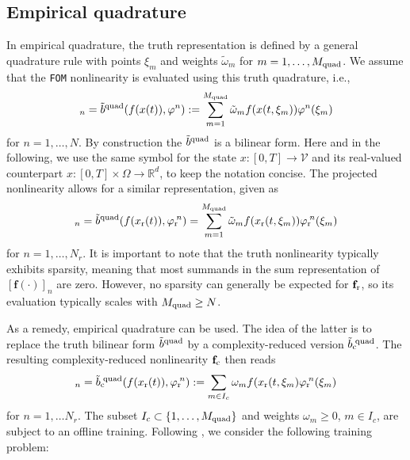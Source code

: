 \documentclass[onefignum,onetabnum]{siamart251104}
\newcommand{\bv}[1]{{\mathbf #1}}
\newcommand{\com}[1]{{{#1}_{\rm{c}}}} %
\newcommand{\rom}[1]{{{#1}_{\rm{r}}}}
\newcommand{\Nr}{{N_r}}
\newcommand{\R}{\mathbb{R}}
\newcommand{\ffun}{{\bv{f}}}
\newcommand{\bform}{{b}}
\newcommand{\tL}{{\fs{\varphi}}}
\newcommand{\fs}[1]{{{#1}}} %
\newcommand{\wei}{{\omega}} %
\newcommand{\xp}{{\xi}} %
\newcommand{\acro}[1]{{\texttt{#1}}}  %
\begin{document}
\subsection{Empirical quadrature} \label{subsec:empQuad}
In empirical quadrature, the truth representation is defined by a general quadrature rule with points ${\xp}_m$ and weights $\tilde{\wei}_m$ for $m = 1,\ldots,M_{\rm quad}$. We assume that the \acro{FOM} nonlinearity is evaluated using this truth quadrature, i.e.,
\begin{align*}
[\ffun(\bv{x}(t))]_n = \tilde{\bform}\!^{\,\rm{quad}}(f(\fs{x}(t)),\tL^n) := \sum_{m=1}^{M_{\rm{quad}}} \tilde{\wei}_m {f}(\fs{x}(t,{\xp}_m))\tL^n({\xp}_m)
\end{align*}
for $n = 1,\ldots, N$.
By construction the $\tilde{\bform}\!^{\,\rm{quad}}$ is a bilinear form. Here and in the following, we use the same symbol for the state $\fs{x} : [0,T] \to \mathcal{V}$ and its real-valued counterpart $\fs{x} : [0,T] \times \Omega \to \R^d$, to keep the notation concise. The projected nonlinearity allows for a similar representation, given as
\begin{align*}
[\rom{\ffun}(\rom{\bv{x}}(t))]_n = \tilde{\bform}^{\rm{quad}}({f}(\rom{\fs{x}}(t)), \rom{\tL}\!^n) =  \sum_{m=1}^{M_{\rm{quad}}} \tilde{\wei}_m {f}(\rom{\fs{x}}(t,{\xp}_m))\rom{\tL}\!^n({\xp}_m)
\end{align*}
for  $n = 1,\ldots, \Nr$. It is important to note that the truth nonlinearity typically exhibits sparsity, meaning that most summands in the sum representation of $[\ffun(\cdot)]_n$ are zero.
However, no sparsity can generally be expected for $\rom{\ffun}$, so its evaluation typically scales with $M_{\rm quad} \geq N$.


As a remedy, empirical quadrature can be used. The idea of the latter is  to replace the truth bilinear form $\tilde{\bform}^{\rm{quad}}$ by a complexity-reduced version $\com{\tilde{\bform}}\!^{\rm{quad}}$.
The resulting complexity-reduced nonlinearity $\com{\ffun}$ then reads
\begin{align*}
[\com{\ffun}(\rom{\bv{x}}(t))]_n = \com{\tilde{\bform}}\!^{\rm{quad}}({f}(\rom{\fs{x}}(t)), \rom{\tL}\!^n) :=  \sum_{m \in I_c} {\wei}_m {f}(\rom{\fs{x}}(t,{\xp}_m) \rom{\tL}\!^n({\xp}_m)
\end{align*}
for $n= 1,\ldots \Nr$.
The subset $I_c \subset \{1,\ldots, {M_{\rm quad}} \}$ and weights $\wei_m \geq 0$, $m\in I_c$, are subject to an offline training. Following \cite{art:hyperreduction-fem-cubature}, we consider the following training problem:
\end{document}
